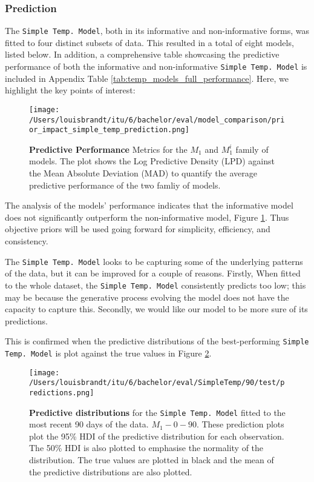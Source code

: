 \subsubsection{Prediction}

The \texttt{Simple Temp.\ Model}, both in its informative and non-informative forms, was
fitted to four distinct subsets of data. This resulted in a total of eight
models, listed below. In addition, a comprehensive table showcasing the predictive performance of both the
informative and non-informative \texttt{Simple Temp.\ Model} is included in
Appendix Table \ref{tab:temp_models_full_performance}. Here, we highlight the key points of interest:

\begin{figure}[h]
  \centering
  \texttt{[image: /Users/louisbrandt/itu/6/bachelor/eval/model\_comparison/prior\_impact\_simple\_temp\_prediction.png]}
  \caption{\textbf{Predictive Performance} Metrics for the $M_1$ and $M_1^i$ family of models. The plot shows the Log Predictive Density (LPD) against the Mean Absolute Deviation (MAD) to quantify the average predictive performance of the two famliy of models.}
  \label{fig:prior_impact_simple_temp_prediction}
\end{figure}

The analysis of the models' performance indicates that the informative model
does not significantly outperform the non-informative model, Figure
\ref{fig:prior_impact_simple_temp_prediction}. Thus objective priors will be
used going forward for simplicity, efficiency, and consistency.

The \texttt{Simple Temp.\ Model} looks to be capturing some of the underlying
patterns of the data, but it can be improved for a couple of reasons. Firstly,
When fitted to the whole dataset, the \texttt{Simple Temp.\ Model} consistently
predicts too low; this may be because the generative process evolving the model
does not have the capacity to capture this. Secondly, we would like our model
to be more sure of its predictions. 

This is confirmed when the predictive distributions of the best-performing
\texttt{Simple Temp.\ Model} is plot against the true values in Figure
\ref{fig:temp_model_90_predictions}.

\begin{figure}[ht]
  \centering
  \texttt{[image: /Users/louisbrandt/itu/6/bachelor/eval/SimpleTemp/90/test/predictions.png]}
  \caption{\textbf{Predictive distributions} for the \texttt{Simple Temp.\ Model} fitted to the most recent 90 days of the data. $M_1{-}0{-}90$. These prediction plots plot the 95\% HDI of the predictive distribution for each observation. The 50\% HDI is also plotted to emphasise the normality of the distribution. The true values are plotted in black and the mean of the predictive distributions are also plotted.}
  \label{fig:temp_model_90_predictions}
\end{figure}

